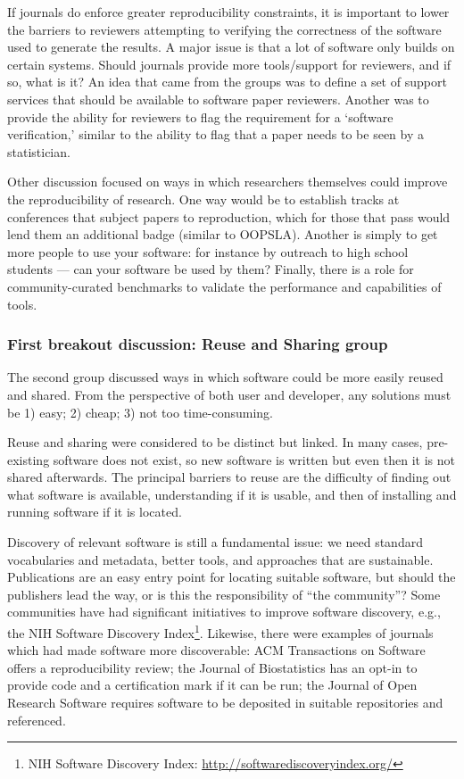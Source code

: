 \documentclass[11pt, oneside]{amsart}
\begin{document}
If journals do enforce greater reproducibility constraints, it is important to
lower the barriers to reviewers attempting to verifying the correctness of the
software used to generate the results. A major issue is that a lot of software
only builds on certain systems. Should journals provide more tools/support for
reviewers, and if so, what is it? An idea that came from the groups was to
define a set of support services that should be available to software paper
reviewers. Another was to provide the ability for reviewers to flag the
requirement for a `software verification,' similar to the ability to flag that a
paper needs to be seen by a statistician.

Other discussion focused on ways in which researchers themselves could improve
the reproducibility of research. One way would be to establish tracks at
conferences that subject papers to reproduction, which for those that pass would
lend them an additional badge (similar to OOPSLA). Another is simply to get more
people to use your software: for instance by outreach to high school students ---
can your software be used by them? Finally, there is a role for
community-curated benchmarks to validate the performance and capabilities of
tools.

\subsubsection{First breakout discussion: Reuse and Sharing group}

The second group discussed ways in which software could be more easily reused
and shared. From the perspective of both user and developer, any solutions must
be 1) easy; 2) cheap; 3) not too time-consuming.

Reuse and sharing were considered to be distinct but linked. In many cases,
pre-existing software does not exist, so new software is written but even then
it is not shared afterwards. The principal barriers to reuse are the difficulty
of finding out what software is available, understanding if it is usable, and
then of installing and running software if it is located.

Discovery of relevant software is still a fundamental issue: we need standard
vocabularies and metadata, better tools, and approaches that are sustainable.
Publications are an easy entry point for locating suitable software, but should
the publishers lead the way, or is this the responsibility of ``the community''?
Some communities have had significant initiatives to improve software discovery,
e.g., the NIH Software Discovery Index\footnote{NIH Software Discovery Index:
\url{http://softwarediscoveryindex.org/}}. Likewise, there were examples of
journals which had made software more discoverable: ACM Transactions on Software
offers a reproducibility review; the Journal of Biostatistics has an opt-in to
provide code and a certification mark if it can be run; the Journal of Open
Research Software requires software to be deposited in suitable repositories and
referenced.
\end{document}

